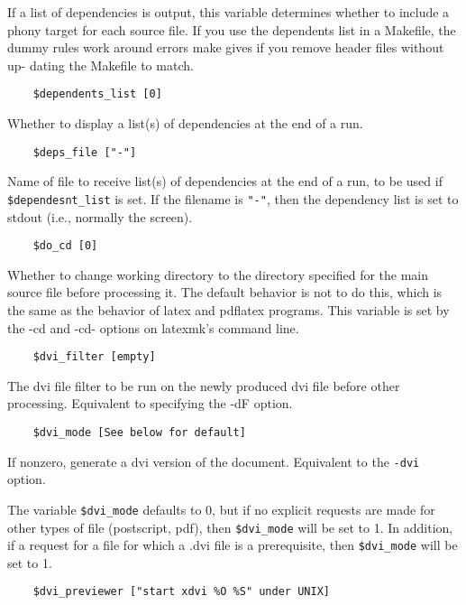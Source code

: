 If  a  list  of dependencies is output, this variable determines
whether to include a phony target for each source file.  If  you
use  the  dependents  list  in  a Makefile, the dummy rules work
around errors make gives if you remove header files without  up-
dating the Makefile to match.

\begin{verbatim}
	$dependents_list [0]
\end{verbatim}

Whether  to  display  a  list(s) of dependencies at the end of a
run.

\begin{verbatim}
	$deps_file ["-"]
\end{verbatim}

Name of file to receive list(s) of dependencies at the end of  a run,  to be
used if \verb|$dependesnt_list| is set.  If the filename is \verb|"-"|, then the dependency
list is set to stdout  (i.e.,  normally the screen).

\begin{verbatim}
	$do_cd [0]
\end{verbatim}

Whether  to  change working directory to the directory specified for the main
source file before processing it.  The default  behavior  is  not to do this,
which is the same as the behavior of latex and pdflatex programs.  This
variable is set  by  the  -cd and -cd- options on latexmk's command line.

\begin{verbatim}
	$dvi_filter [empty]
\end{verbatim}

The  dvi  file  filter  to be run on the newly produced dvi file before other
processing.  Equivalent to specifying the  -dF  option.

\begin{verbatim}
	$dvi_mode [See below for default]
\end{verbatim}

If  nonzero, generate a dvi version of the document.  Equivalent
to the \verb|-dvi| option.

The variable \verb|$dvi_mode| defaults to 0, but  if  no  explicit  requests
are made for other types of file (postscript, pdf), then \verb|$dvi_mode| will be set
to 1.  In addition, if  a  request  for  a file  for  which  a  .dvi file is a
prerequisite, then \verb|$dvi_mode| will be set to 1.

\begin{verbatim}
	$dvi_previewer ["start xdvi %O %S" under UNIX]
\end{verbatim}

